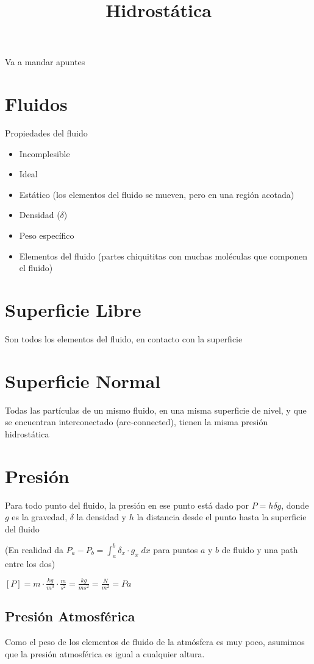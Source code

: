 \documentclass{article}
\title{Hidrostática}
\date{}
\author{}
\begin{document}
\maketitle
Va a mandar apuntes
\section{Fluidos}
Propiedades del fluido
\begin{itemize}
	\item Incomplesible
	\item Ideal
	\item Estático (los elementos del fluido se mueven, pero en una región
		acotada)
	\item Densidad ($\delta$)
	\item Peso específico
	\item Elementos del fluido (partes chiquititas con muchas moléculas que
		componen el fluido)
\end{itemize}
\section{Superficie Libre}
Son todos los elementos del fluido, en contacto con la superficie

\section{Superficie Normal}
Todas las partículas de un mismo fluido, en una misma superficie de nivel, y
que se encuentran interconectado (arc-connected),
tienen la misma presión hidrostática

\section{Presión}
Para todo punto del fluido, la presión en ese punto está dado por \(
	P = h \delta g
\), donde $g$ es la gravedad, $\delta$ la densidad y $h$ la distancia desde
el punto hasta la superficie del fluido

(En realidad da \(
	P_a - P_b = \int_a^b \delta _x \cdot g _x\; dx
\) para puntos $a$ y $b$ de fluido y una path entre los dos)

\(
[P] = m \cdot \frac{kg}{m^3} \cdot \frac{m}{s^2} = \frac{kg}{ms^2} =
\frac{N}{m^2} = Pa
\)

\subsection{Presión Atmosférica}
Como el peso de los elementos de fluido de la atmósfera es muy poco,
asumimos que la presión atmosférica es igual a cualquier altura.
\end{document}
